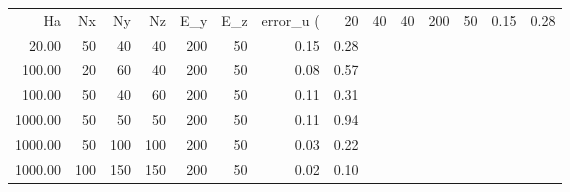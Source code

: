 \begin{tabular}{rrrrrrrr}
\toprule
Ha & Nx & Ny & Nz & E_y & E_z & error_u (%
 & 20 & 40 & 40 & 200 & 50 & 0.15 & 0.28 \\
20.00 & 50 & 40 & 40 & 200 & 50 & 0.15 & 0.28 \\
100.00 & 20 & 60 & 40 & 200 & 50 & 0.08 & 0.57 \\
100.00 & 50 & 40 & 60 & 200 & 50 & 0.11 & 0.31 \\
1000.00 & 50 & 50 & 50 & 200 & 50 & 0.11 & 0.94 \\
1000.00 & 50 & 100 & 100 & 200 & 50 & 0.03 & 0.22 \\
1000.00 & 100 & 150 & 150 & 200 & 50 & 0.02 & 0.10 \\
\bottomrule
\end{tabular}

